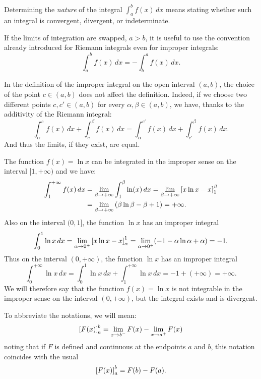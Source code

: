\begin{definition}
Determining the \emph{nature} %
%
%
%
of the integral $\int_a^b f(x)\, dx$ means stating whether such an integral is
convergent, divergent, or indeterminate.

If the limits of integration are swapped, $a>b$, it is useful to use the
convention already introduced for Riemann integrals even for improper integrals:
\[
  \int_a^b f(x) \, dx = - \int_b^a f(x)\, dx.
\]
\end{definition}

\begin{remark}\label{rem:4821341}
In the definition of the improper integral on the open interval $(a,b)$, the
choice of the point $c\in(a,b)$ does not affect the definition. Indeed, if we
choose two different points $c,c'\in(a,b)$ for every $\alpha,\beta \in (a,b)$,
we have, thanks to the additivity of the Riemann integral:
\[
  \int_\alpha^c f(x)\,dx + \int_c^\beta f(x)\,dx =
  \int_\alpha^{c'} f(x)\, dx + \int_{c'}^\beta f(x)\, dx.
\]
And thus the limits, if they exist, are equal.
\end{remark}

\begin{example}
The function $f(x)= \ln x$ can be integrated in the improper sense on the
interval $[1,+\infty)$ and we have:
\begin{align*}
 \int_1^{+\infty} f(x)\,dx
 &= \lim_{\beta\to +\infty} \int_1^\beta \ln(x)\, dx
 = \lim_{\beta\to +\infty}{\left[ x\ln x - x \right]}_1^\beta \\
 &= \lim_{\beta\to +\infty} {\left( \beta \ln \beta - \beta + 1 \right)}
 = +\infty.
\end{align*}
Also on the interval $(0,1]$, the function $\ln x$ has an improper integral
\[
  \int_0^1 \ln x\, dx = \lim_{\alpha \to 0^+}{\left[ x \ln x -x \right]}_\alpha^1
  = \lim_{\alpha\to 0^+} (-1-\alpha \ln \alpha + \alpha)  = -1.
\]
Thus on the interval $(0,+\infty)$, the function $\ln x$ has an improper
integral
\[
  \int_0^{+\infty}\ln x\, dx = \int_0^1 \ln x\, dx + \int_1^{+\infty}\ln x\, dx
   = -1 + (+\infty) = +\infty.
\]
We will therefore say that the function $f(x)=\ln x$ is not integrable in the
improper sense on the interval $(0,+\infty)$, but the integral exists and is
divergent.
\end{example}

To abbreviate the notations, we will mean:
\[
  {\left[ F(x) \right]}_a^b
  = \lim_{x\to b^-}F(x) - \lim_{x\to a^+}F(x)
\]
noting that if $F$ is defined and continuous at the endpoints $a$ and $b$, this
notation coincides with the usual
\[
{\left[ F(x) \right]}_a^b = F(b) - F(a).
\]

